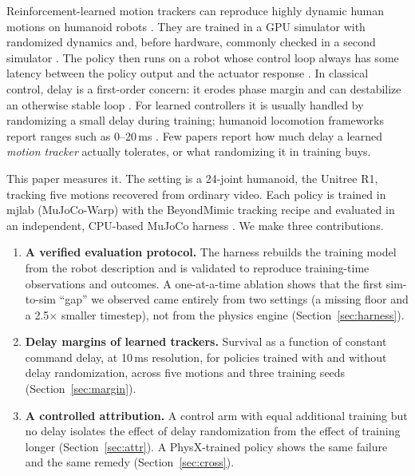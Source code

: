 \documentclass{l4dc2026}
\begin{document}
Reinforcement-learned motion trackers can reproduce highly dynamic human motions on humanoid robots \citep{liao2025beyondmimic,he2025asap}.
They are trained in a GPU simulator with randomized dynamics \citep{tobin2017domain,peng2018sim} and, before hardware, commonly checked in a second simulator \citep{gu2024humanoid,lei2025polysim}.
The policy then runs on a robot whose control loop always has some latency between the policy output and the actuator response \citep{tan2018simtoreal,hwangbo2019learning}.
In classical control, delay is a first-order concern: it erodes phase margin and can destabilize an otherwise stable loop \citep{richard2003time}.
For learned controllers it is usually handled by randomizing a small delay during training; humanoid locomotion frameworks report ranges such as 0--20\,ms \citep{wang2025booster,seo2025learning}.
Few papers report how much delay a learned \emph{motion tracker} actually tolerates, or what randomizing it in training buys.

This paper measures it.
The setting is a 24-joint humanoid, the Unitree R1, tracking five motions recovered from ordinary video.
Each policy is trained in mjlab (MuJoCo-Warp) \citep{zakka2026mjlab} with the BeyondMimic tracking recipe \citep{liao2025beyondmimic} and evaluated in an independent, CPU-based MuJoCo harness \citep{todorov2012mujoco}.
We make three contributions.
\begin{enumerate}
  \item \textbf{A verified evaluation protocol.} The harness rebuilds the training model from the robot description and is validated to reproduce training-time observations and outcomes. A one-at-a-time ablation shows that the first sim-to-sim ``gap'' we observed came entirely from two settings (a missing floor and a 2.5$\times$ smaller timestep), not from the physics engine (Section~\ref{sec:harness}).
  \item \textbf{Delay margins of learned trackers.} Survival as a function of constant command delay, at 10\,ms resolution, for policies trained with and without delay randomization, across five motions and three training seeds (Section~\ref{sec:margin}).
  \item \textbf{A controlled attribution.} A control arm with equal additional training but no delay isolates the effect of delay randomization from the effect of training longer (Section~\ref{sec:attr}). A PhysX-trained policy shows the same failure and the same remedy (Section~\ref{sec:cross}).
\end{enumerate}
\end{document}
